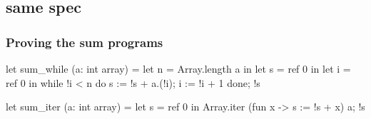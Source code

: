 \documentclass[xcolor=dvipsnames]{beamer}
\begin{document}
\subsection*{same spec}
\begin{frame}[fragile]\frametitle{Proving the sum programs}
\begin{adjustwidth}{-0.3cm}{1.0cm}
\begin{small}
\begin{minipage}[t]{0.4\textwidth}
\begin{whycode}  
let sum_while (a: int array)
= let n = Array.length a in
  let s = ref 0 in
  let i = ref 0 in
  while !i < n do
    s := !s + a.(!i);
    i := !i + 1
  done;
  !s
\end{whycode}
\end{minipage}\hfill
\begin{minipage}[t]{0.4\textwidth}
\begin{whycode} 
let sum_iter (a: int array)
= let s = ref 0 in
  Array.iter 
    (fun x -> s := !s + x) a;
  !s
\end{whycode}	
\end{minipage}
\end{small}
\end{adjustwidth}
\end{frame}
\end{document}
